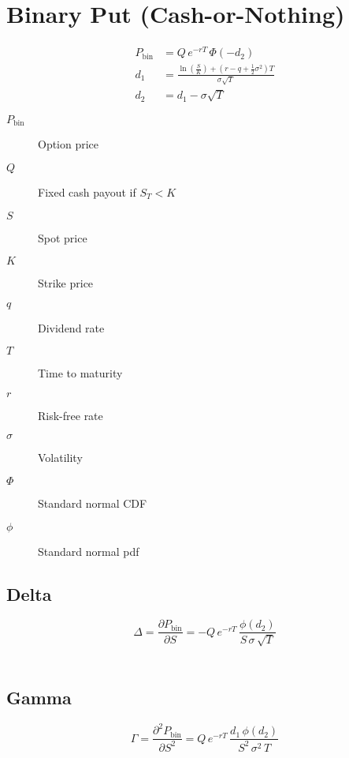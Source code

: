 \documentclass[12pt,a4paper]{article}
\begin{document}
\newpage

\section{Binary Put (Cash-or-Nothing)}

\[
  \begin{aligned}
    P_{\mathrm{bin}} & = Q \, e^{-rT} \,\Phi(-d_2) \\ 
    d_1 & = \frac{\ln\!\left(\tfrac{S}{K}\right) + (r - q + \tfrac{1}{2}\sigma^2)T}{\sigma \sqrt{T}} \\
    d_2 & = d_1 - \sigma \sqrt{T}
  \end{aligned}
\]

\begin{description}
  \item[$P_{\mathrm{bin}}$] Option price
  \item[$Q$] Fixed cash payout if \( S_T < K \)
  \item[$S$] Spot price
  \item[$K$] Strike price
  \item[$q$] Dividend rate
  \item[$T$] Time to maturity
  \item[$r$] Risk-free rate
  \item[$\sigma$] Volatility
  \item[$\Phi$] Standard normal CDF
  \item[$\phi$] Standard normal pdf
\end{description}

\subsection{Delta}
\[
  \boxed{\Delta = \frac{\partial P_{\mathrm{bin}}}{\partial S}
  = -Q\, e^{-rT}\, \frac{\phi(d_2)}{S\,\sigma\,\sqrt{T}}}
\]

\[
  \begin{aligned}
  \end{aligned}
\]

\subsection{Gamma}
\[
  \boxed{\Gamma = \frac{\partial^2 P_{\mathrm{bin}}}{\partial S^2}
  = Q\, e^{-rT}\, \frac{d_1\,\phi(d_2)}{S^2\,\sigma^2\,T}}
\]

\[
  \begin{aligned}
  \end{aligned}
\]
\end{document}
